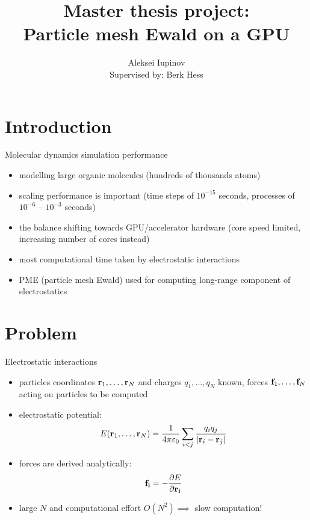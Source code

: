 \documentclass[11pt]{beamer}
\author[Aleksei Iupinov]{Aleksei Iupinov\\{\footnotesize Supervised by: Berk Hess}}
\title{Master thesis project: \\Particle mesh Ewald on a GPU}
\institute{KTH Royal Institute of Technology}
\begin{document}
\captionsetup[figure]{labelformat=empty}

\begin{frame}
\titlepage
\end{frame}

\begin{frame}
\tableofcontents
\end{frame}

\section{Introduction}
\begin{frame}{Molecular dynamics simulation performance}
\begin{itemize}
\item modelling large organic molecules (hundreds of thousands atoms)
\item scaling performance is important (time steps of $10^{-15}$ seconds, processes of $10^{-6}$ -- $10^{-3}$ seconds) 
\item the balance shifting towards GPU/accelerator hardware (core speed limited, increasing number of cores instead)
\item most computational time taken by electrostatic interactions
\item PME (particle mesh Ewald) used for computing long-range component of electrostatics
\end{itemize}
\end{frame}

\section{Problem}
\begin{frame}{Electrostatic interactions}
\begin{itemize}
\item particles coordinates $\bold{r}_1, \dotsc, \bold{r}_N$ and charges $q_1, \dotsc, q_N$ known, forces $\bold{f}_1, \dotsc, \bold{f}_N$ acting on particles to be computed 
\item electrostatic potential:
\[E(\bold{r}_1, \dotsc, \bold{r}_N) = \frac{1}{4 \pi \varepsilon_0}\sum\limits_{i < j}\frac{q_i q_j}{\lvert \bold{r}_i-\bold{r}_j\rvert}\]
\item forces are derived analytically:
\[\bold{f_i} = -\frac{\partial E}{\partial \bold{r_i}} \]
\item large $N$ and computational effort $O(N^2) \implies$ slow computation!
\end{itemize}
\end{frame}
\end{document}
